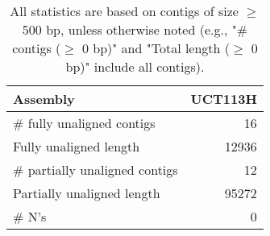 \documentclass[12pt,a4paper]{article}
\begin{document}
\begin{table}[ht]
\begin{center}
\caption{All statistics are based on contigs of size $\geq$ 500 bp, unless otherwise noted (e.g., "\# contigs ($\geq$ 0 bp)" and "Total length ($\geq$ 0 bp)" include all contigs).}
\begin{tabular}{|l*{1}{|r}|}
\hline
Assembly & UCT113H \\ \hline
\# fully unaligned contigs & 16 \\ \hline
Fully unaligned length & 12936 \\ \hline
\# partially unaligned contigs & 12 \\ \hline
Partially unaligned length & 95272 \\ \hline
\# N's & 0 \\ \hline
\end{tabular}
\end{center}
\end{table}
\end{document}
